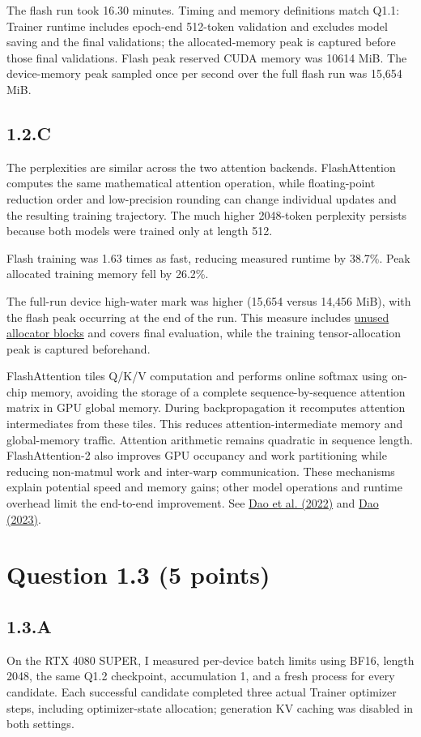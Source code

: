 \documentclass{article}
\begin{document}
The flash run took 16.30 minutes. Timing and memory definitions match Q1.1: Trainer runtime includes epoch-end 512-token validation and excludes model saving and the final validations; the allocated-memory peak is captured before those final validations. Flash peak reserved CUDA memory was 10614 MiB. The device-memory peak sampled once per second over the full flash run was 15,654 MiB.

\subsection*{1.2.C}
The perplexities are similar across the two attention backends. FlashAttention computes the same mathematical attention operation, while floating-point reduction order and low-precision rounding can change individual updates and the resulting training trajectory. The much higher 2048-token perplexity persists because both models were trained only at length 512.

Flash training was 1.63 times as fast, reducing measured runtime by 38.7\%. Peak allocated training memory fell by 26.2\%.

The full-run device high-water mark was higher (15,654 versus 14,456 MiB), with the flash peak occurring at the end of the run. This measure includes \href{https://docs.pytorch.org/docs/2.4/notes/cuda.html#memory-management}{unused allocator blocks} and covers final evaluation, while the training tensor-allocation peak is captured beforehand.

FlashAttention tiles Q/K/V computation and performs online softmax using on-chip memory, avoiding the storage of a complete sequence-by-sequence attention matrix in GPU global memory. During backpropagation it recomputes attention intermediates from these tiles. This reduces attention-intermediate memory and global-memory traffic. Attention arithmetic remains quadratic in sequence length. FlashAttention-2 also improves GPU occupancy and work partitioning while reducing non-matmul work and inter-warp communication. These mechanisms explain potential speed and memory gains; other model operations and runtime overhead limit the end-to-end improvement. See \href{https://arxiv.org/abs/2205.14135}{Dao et al. (2022)} and \href{https://arxiv.org/abs/2307.08691}{Dao (2023)}.

\clearpage
\section*{Question 1.3 (5 points)}
\subsection*{1.3.A}
On the RTX 4080 SUPER, I measured per-device batch limits using BF16, length 2048, the same Q1.2 checkpoint, accumulation 1, and a fresh process for every candidate. Each successful candidate completed three actual Trainer optimizer steps, including optimizer-state allocation; generation KV caching was disabled in both settings.
\end{document}
